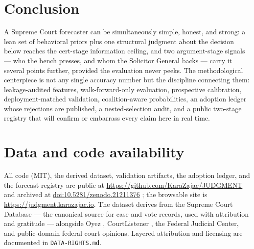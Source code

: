 \documentclass[11pt]{article}
\newcommand{\code}[1]{\texttt{#1}}
\begin{document}
\section{Conclusion}

A Supreme Court forecaster can be simultaneously simple, honest, and strong: a
lean set of behavioral priors plus one structural judgment about the decision
below reaches the cert-stage information ceiling, and two argument-stage
signals --- who the bench presses, and whom the Solicitor General backs ---
carry it several points further, provided the evaluation never peeks. The
methodological centerpiece is not any single accuracy number but the discipline
connecting them: leakage-audited features, walk-forward-only evaluation,
prospective calibration, deployment-matched validation, coalition-aware
probabilities, an adoption ledger whose rejections are published, a
nested-selection audit, and a public two-stage registry that will confirm or
embarrass every claim here in real time.

\section*{Data and code availability}

All code (MIT), the derived dataset, validation artifacts, the adoption ledger,
and the forecast registry are public at
\url{https://github.com/KaraZajac/JUDGMENT} and archived at
\href{https://doi.org/10.5281/zenodo.21211376}{doi:10.5281/zenodo.21211376}
\citep{judgmentdata}; the browsable site is \url{https://judgment.karazajac.io}.
The dataset derives from the Supreme Court Database \citep{scdb2025} --- the
canonical source for case and vote records, used with attribution and
gratitude --- alongside Oyez \citep{oyez}, CourtListener \citep{courtlistener},
the Federal Judicial Center, and public-domain federal court opinions. Layered
attribution and licensing are documented in \code{DATA-RIGHTS.md}.



\end{document}
